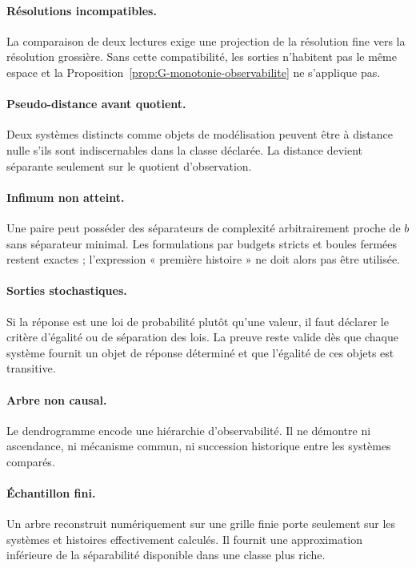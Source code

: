 \paragraph{Résolutions incompatibles.}
La comparaison de deux lectures exige une projection de la résolution fine vers la résolution grossière. Sans cette compatibilité, les sorties n'habitent pas le même espace et la Proposition~\ref{prop:G-monotonie-observabilite} ne s'applique pas.

\paragraph{Pseudo-distance avant quotient.}
Deux systèmes distincts comme objets de modélisation peuvent être à distance nulle s'ils sont indiscernables dans la classe déclarée. La distance devient séparante seulement sur le quotient d'observation.

\paragraph{Infimum non atteint.}
Une paire peut posséder des séparateurs de complexité arbitrairement proche de \(b\) sans séparateur minimal. Les formulations par budgets stricts et boules fermées restent exactes ; l'expression « première histoire » ne doit alors pas être utilisée.

\paragraph{Sorties stochastiques.}
Si la réponse est une loi de probabilité plutôt qu'une valeur, il faut déclarer le critère d'égalité ou de séparation des lois. La preuve reste valide dès que chaque système fournit un objet de réponse déterminé et que l'égalité de ces objets est transitive.

\paragraph{Arbre non causal.}
Le dendrogramme encode une hiérarchie d'observabilité. Il ne démontre ni ascendance, ni mécanisme commun, ni succession historique entre les systèmes comparés.

\paragraph{Échantillon fini.}
Un arbre reconstruit numériquement sur une grille finie porte seulement sur les systèmes et histoires effectivement calculés. Il fournit une approximation inférieure de la séparabilité disponible dans une classe plus riche.

